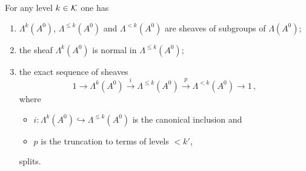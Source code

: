 \begin{comment}
  See \cite[I.5]{Loday1994} on p.\ 861f (See [LR91])
\end{comment}
\begin{prop}\label{prop:PropertiesOfStokesSheafSplitting}
  For any level $k\in\mathcal{K}$ one has
  \begin{enumerate}
    \item $\Lambda^{k}(A^0)$, $\Lambda^{\leq k}(A^0)$ and $\Lambda^{<k}(A^0)$
      are sheaves of subgroups of $\Lambda(A^0)$;
    \item the sheaf $\Lambda^k(A^0)$ is normal in $\Lambda^{\leq k}(A^0)$;
      \begin{comment}
        A subgroup $N$ is normal in $G$ ($N\vartriangleleft G$) if it is stable
        under conjugation, i.e.
        \[
          N\vartriangleleft G \Leftrightarrow \forall n\in N \forall g\in G,
          gng^{-1}\in N ,.
        \]
      \end{comment}
    \item {}
      the exact sequence of sheaves
      \[
        1\longrightarrow\Lambda^k(A^0)
        \overset{i}\longrightarrow\Lambda^{\leq k}(A^0)
        \overset{p}\longrightarrow\Lambda^{<k}(A^0)
        \longrightarrow 1 \,,
      \]
      where
      \begin{itemize}
        \item $i:\Lambda^k(A^0)\hookrightarrow\Lambda^{\leq k}(A^0)$ is the
          canonical inclusion and
        \item $p$ is the truncation to terms of levels $<k'$,
      \end{itemize}
      splits.
  \end{enumerate}
\end{prop}
